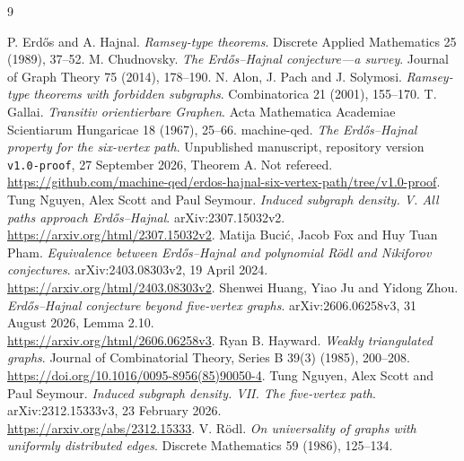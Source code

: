 \documentclass[11pt,a4paper]{article}
\theoremstyle{definition}
\theoremstyle{remark}
\numberwithin{equation}{section}
\begin{document}
\begin{thebibliography}{9}\small\raggedright
{} P. Erd\H{o}s and A. Hajnal. \emph{Ramsey-type theorems}. Discrete Applied Mathematics 25 (1989), 37--52.
 M. Chudnovsky. \emph{The Erd\H{o}s--Hajnal conjecture---a survey}. Journal of Graph Theory 75 (2014), 178--190.
 N. Alon, J. Pach and J. Solymosi. \emph{Ramsey-type theorems with forbidden subgraphs}. Combinatorica 21 (2001), 155--170.
 T. Gallai. \emph{Transitiv orientierbare Graphen}. Acta Mathematica Academiae Scientiarum Hungaricae 18 (1967), 25--66.
 machine-qed. \emph{The Erd\H{o}s--Hajnal property for the six-vertex path}. Unpublished manuscript, repository version \texttt{v1.0-proof}, 27 September 2026, Theorem A. Not refereed.\\ \url{https://github.com/machine-qed/erdos-hajnal-six-vertex-path/tree/v1.0-proof}.
 Tung Nguyen, Alex Scott and Paul Seymour. \emph{Induced subgraph density. V. All paths approach Erd\H{o}s--Hajnal}. arXiv:2307.15032v2.\\ \url{https://arxiv.org/html/2307.15032v2}.
 Matija Buci\'c, Jacob Fox and Huy Tuan Pham. \emph{Equivalence between Erd\H{o}s--Hajnal and polynomial R\"odl and Nikiforov conjectures}. arXiv:2403.08303v2, 19 April 2024.\\ \url{https://arxiv.org/html/2403.08303v2}.
 Shenwei Huang, Yiao Ju and Yidong Zhou. \emph{Erd\H{o}s--Hajnal conjecture beyond five-vertex graphs}. arXiv:2606.06258v3, 31 August 2026, Lemma 2.10.\\ \url{https://arxiv.org/html/2606.06258v3}.
 Ryan B. Hayward. \emph{Weakly triangulated graphs}. Journal of Combinatorial Theory, Series B 39(3) (1985), 200--208.\\ \url{https://doi.org/10.1016/0095-8956(85)90050-4}.
 Tung Nguyen, Alex Scott and Paul Seymour. \emph{Induced subgraph density. VII. The five-vertex path}. arXiv:2312.15333v3, 23 February 2026.\\ \url{https://arxiv.org/abs/2312.15333}.
 V. R\"odl. \emph{On universality of graphs with uniformly distributed edges}. Discrete Mathematics 59 (1986), 125--134.
\end{thebibliography}
\end{document}
